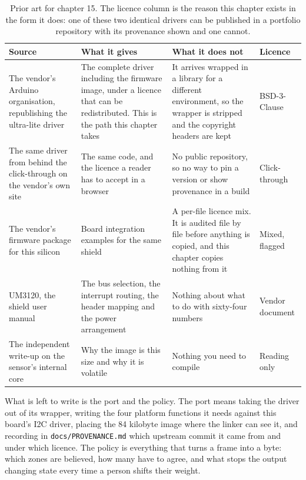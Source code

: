 \begin{table}[H]\centering\small
\begin{tabular}{p{34mm}p{46mm}p{38mm}p{20mm}}
\toprule
Source & What it gives & What it does not & Licence \\
\midrule
The vendor's Arduino organisation, republishing the ultra-lite driver & The complete driver including the firmware image, under a licence that can be redistributed. This is the path this chapter takes & It arrives wrapped in a library for a different environment, so the wrapper is stripped and the copyright headers are kept & BSD-3-Clause \\
The same driver from behind the click-through on the vendor's own site & The same code, and the licence a reader has to accept in a browser & No public repository, so no way to pin a version or show provenance in a build & Click-through \\
The vendor's firmware package for this silicon & Board integration examples for the same shield & A per-file licence mix. It is audited file by file before anything is copied, and this chapter copies nothing from it & Mixed, flagged \\
UM3120, the shield user manual & The bus selection, the interrupt routing, the header mapping and the power arrangement & Nothing about what to do with sixty-four numbers & Vendor document \\
The independent write-up on the sensor's internal core & Why the image is this size and why it is volatile & Nothing you need to compile & Reading only \\
\bottomrule
\end{tabular}
\caption{Prior art for chapter 15. The licence column is the reason this chapter exists in the form it does: one of these two identical drivers can be published in a portfolio repository with its provenance shown and one cannot.}
\end{table}

What is left to write is the port and the policy. The port means taking the
driver out of its wrapper, writing the four platform functions it needs against
this board's I2C driver, placing the 84 kilobyte image where the linker can see
it, and recording in \texttt{docs/PROVENANCE.md} which upstream commit it came
from and under which licence. The policy is everything that turns a frame into a
byte: which zones are believed, how many have to agree, and what stops the
output changing state every time a person shifts their weight.


